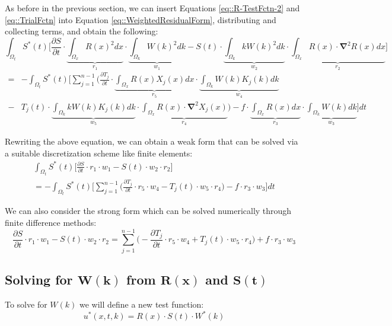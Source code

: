 \documentclass{article}
\def\ds{\displaystyle}
\def\pd{\partial}
\def\grad{\mathbf\nabla}
\begin{document}
As before in the previous section, we can insert Equations \ref{eq::R-TestFctn-2} and \ref{eq::TrialFctn} into Equation \ref{eq::WeightedResidualForm}, distributing and collecting terms, and obtain the following:
\begin{equation*}
\ds\int_{\Omega_t} S^*(t) \bigg[ \frac{\pd S}{\pd t} \cdot \underbrace{\ds\int_{\Omega_x} R(x)^2 dx}_{r_1} \cdot \underbrace{\ds\int_{\Omega_k}W(k)^2 dk}_{w_1} - S(t) \cdot \underbrace{\ds\int_{\Omega_k}kW(k)^2dk}_{w_2} \cdot \underbrace{\int_{\Omega_x} R(x)\cdot\grad^2R(x) dx}_{r_2} \bigg]
\end{equation*}\vspace{-15pt}
\begin{align}
= & - \ds\int_{\Omega_t} S^*(t) \Bigg[ \ds\sum_{j=1}^{n-1} \bigg( \frac{\pd T_j}{\pd t} \cdot  \underbrace{\ds\int_{\Omega_x} R(x) X_j(x) dx}_{r_5} \cdot \underbrace{\ds\int_{\Omega_k}W(k)K_j(k) dk}_{w_4} \nonumber\\
 - & T_j(t)\cdot \underbrace{\ds\int_{\Omega_k} kW(k)K_j(k)dk}_{w_5} \cdot \underbrace{\ds\int_{\Omega_x} R(x)\cdot\grad^2X_j(x)}_{r_4} \bigg) - f \cdot \underbrace{\ds\int_{\Omega_x} R(x)dx}_{r_3} \cdot \underbrace{\ds\int_{\Omega_k} W(k)dk}_{w_3} \Bigg] dt
\end{align}

Rewriting the above equation, we can obtain a weak form that can be solved via a suitable discretization scheme like finite elements:
\begin{gather}
\ds\int_{\Omega_t} S^*(t) \bigg[ \frac{\pd S}{\pd t} \cdot r_1 \cdot w_1- S(t) \cdot w_2 \cdot r_2 \bigg] \nonumber \\
= - \ds\int_{\Omega_t} S^*(t) \Bigg[ \ds\sum_{j=1}^{n-1} \bigg( \frac{\pd T_j}{\pd t} \cdot r_5 \cdot w_4 - T_j(t)\cdot w_5 \cdot r_4 \bigg) - f \cdot r_3 \cdot w_3 \Bigg] dt
\end{gather}

We can also consider the strong form which can be solved numerically through finite difference methods:
\begin{equation}
\label{eq::S-Strong}
\frac{\pd S}{\pd t} \cdot r_1 \cdot w_1 - S(t) \cdot w_2 \cdot r_2 = \ds\sum_{j=1}^{n-1} \bigg( - \frac{\pd T_j}{\pd t} \cdot r_5 \cdot w_4 + T_j(t)\cdot w_5 \cdot r_4 \bigg) + f \cdot r_3 \cdot w_3
\end{equation}

\subsection{Solving for $\mathbf{W(k)}$ from $\mathbf{R(x)}$ and $\mathbf{S(t)}$}
To solve for $W(k)$ we will define a new test function:
\begin{equation}
\label{eq::R-TestFctn-3}
u^*(x,t,k) = R(x) \cdot S(t) \cdot W^*(k)
\end{equation}
\end{document}
